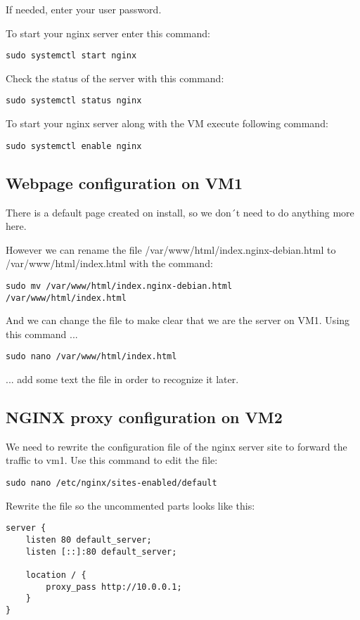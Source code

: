 \documentclass[10pt,a4paper]{article}
\begin{document}
If needed, enter your user password.

To start your nginx server enter this command:
\begin{verbatim}
sudo systemctl start nginx
\end{verbatim}

Check the status of the server with this command:
\begin{verbatim}
sudo systemctl status nginx
\end{verbatim}

To start your nginx server along with the VM execute following command:
\begin{verbatim}
sudo systemctl enable nginx
\end{verbatim}

\subsection{Webpage configuration on VM1}
There is a default page created on install, so we don´t need to do anything more here.

However we can rename the file /var/www/html/index.nginx-debian.html to /var/www/html/index.html with the command:
\begin{verbatim}
sudo mv /var/www/html/index.nginx-debian.html 
/var/www/html/index.html
\end{verbatim}

And we can change the file to make clear that we are the server on VM1. Using this command ...
\begin{verbatim}
sudo nano /var/www/html/index.html
\end{verbatim}

... add some text the file in order to recognize it later.

\subsection{NGINX proxy configuration on VM2}
We need to rewrite the configuration file of the nginx server site to forward the traffic to vm1. Use this command to edit the file:
\begin{verbatim}
sudo nano /etc/nginx/sites-enabled/default
\end{verbatim}

Rewrite the file so the uncommented parts looks like this:
\begin{verbatim}
server {
	listen 80 default_server;
	listen [::]:80 default_server;
	
	location / {
		proxy_pass http://10.0.0.1;
	}
}
\end{verbatim}
\end{document}
